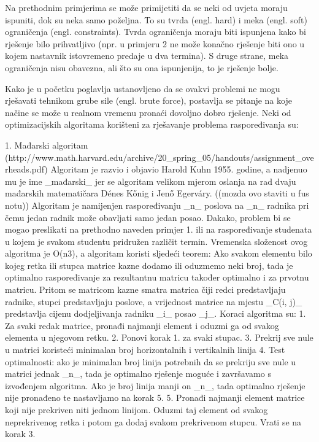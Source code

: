 Na prethodnim primjerima se može primijetiti da se neki od uvjeta moraju ispuniti, dok su neka samo poželjna. To su tvrda
(engl. hard) i meka (engl. soft) ograničenja (engl. constraints). Tvrda ograničenja moraju biti ispunjena kako bi rješenje bilo
prihvatljivo (npr. u primjeru 2 ne može konačno rješenje biti ono u kojem nastavnik istovremeno predaje u dva termina). S druge strane,
meka ograničenja nisu obavezna, ali što su ona ispunjenija, to je rješenje bolje.

Kako je u početku poglavlja ustanovljeno da se ovakvi problemi ne mogu rješavati tehnikom grube sile (engl. brute force), postavlja
se pitanje na koje načine se može u realnom vremenu pronaći dovoljno dobro rješenje. Neki od optimizacijskih algoritama korišteni
za rješavanje problema raspoređivanja su:

1. Mađarski algoritam (http://www.math.harvard.edu/archive/20_spring_05/handouts/assignment_overheads.pdf)
Algoritam je razvio i objavio Harold Kuhn 1955. godine, a nadjenuo mu je ime _mađarski_ jer se algoritam velikom mjerom oslanja
na rad dvaju mađarskih matematičara Dénes Kőnig i Jenő Egerváry. ((mozda ovo staviti u fus notu))
Algoritam je namijenjen raspoređivanju _n_ poslova na _n_ radnika pri čemu jedan radnik može obavljati samo jedan posao. Dakako,
problem bi se mogao preslikati na prethodno naveden primjer 1. ili na raspoređivanje studenata u kojem je svakom studentu pridružen
različit termin. Vremenska složenost ovog algoritma je O(n3), a algoritam koristi sljedeći teorem:
Ako svakom elementu bilo kojeg retka ili stupca matrice kazne dodamo ili oduzmemo neki broj, tada je optimalno raspoređivanje za rezultantnu
matricu također optimalno i za prvotnu matricu. Pritom se matricom kazne smatra matrica čiji redci predstavljaju radnike, stupci predstavljaju
poslove, a vrijednost matrice na mjestu _C(i, j)_ predstavlja cijenu dodjeljivanja radniku _i_ posao _j_.
Koraci algoritma su:
1. Za svaki redak matrice, pronađi najmanji element i oduzmi ga od svakog elementa u njegovom retku.
2. Ponovi korak 1. za svaki stupac.
3. Prekrij sve nule u matrici koristeći minimalan broj horizontalnih i vertikalnih linija
4. Test optimalnosti: ako je minimalan broj linija potrebnih da se prekriju sve nule u matrici jednak _n_, tada je optimalno rješenje moguće
i završavamo s izvođenjem algoritma. Ako je broj linija manji on _n_, tada optimalno rješenje nije pronađeno te nastavljamo na korak 5.
5. Pronađi najmanji element matrice koji nije prekriven niti jednom linijom. Oduzmi taj element od svakog neprekrivenog retka i potom
ga dodaj svakom prekrivenom stupcu. Vrati se na korak 3.


